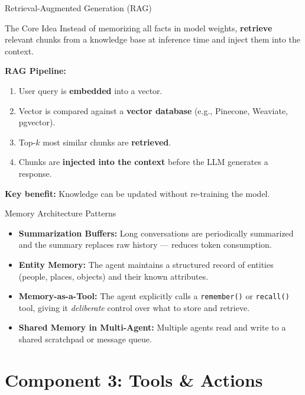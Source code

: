 \documentclass{beamer}       %
\begin{document}
\begin{frame}{Retrieval-Augmented Generation (RAG)}
    \begin{block}{The Core Idea}
        Instead of memorizing all facts in model weights, \textbf{retrieve} relevant chunks from a knowledge base at inference time and inject them into the context.
    \end{block}
    \vspace{0.2cm}
    \textbf{RAG Pipeline:}
    \begin{enumerate}
        \item User query is \textbf{embedded} into a vector.
        \item Vector is compared against a \textbf{vector database} (e.g., Pinecone, Weaviate, pgvector).
        \item Top-$k$ most similar chunks are \textbf{retrieved}.
        \item Chunks are \textbf{injected into the context} before the LLM generates a response.
    \end{enumerate}
    \vspace{0.15cm}
    \textbf{Key benefit:} Knowledge can be updated without re-training the model.
\end{frame}

\begin{frame}{Memory Architecture Patterns}
    \begin{itemize}
        \item \textbf{Summarization Buffers:} Long conversations are periodically summarized and the summary replaces raw history --- reduces token consumption.
        \item \textbf{Entity Memory:} The agent maintains a structured record of entities (people, places, objects) and their known attributes.
        \item \textbf{Memory-as-a-Tool:} The agent explicitly calls a \texttt{remember()} or \texttt{recall()} tool, giving it \emph{deliberate} control over what to store and retrieve.
        \item \textbf{Shared Memory in Multi-Agent:} Multiple agents read and write to a shared scratchpad or message queue.
    \end{itemize}
\end{frame}


\section{Component 3: Tools \& Actions}
\end{document}
